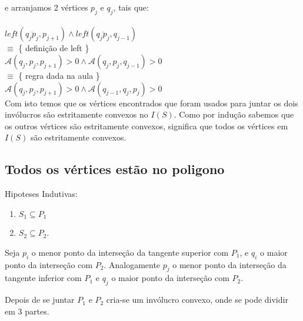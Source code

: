 \documentclass[11pt]{article}
\begin{document}
e arranjamos 2 vértices $p_j$ e $q_j$, tais que:\\
\\
$left(\overline{q_j p_j}, p_{j+1}) \wedge left(\overline{q_j p_j}, q_{j-1})$\\
$\equiv$ \{ definição de left \}\\
$\mathcal{A}(q_j, p_j, p_{j+1}) > 0 \wedge \mathcal{A}(q_j, p_j, q_{j-1}) > 0$\\
$\equiv$ \{ regra dada na aula \}\\
$\mathcal{A}(q_j, p_j, p_{j+1}) > 0 \wedge \mathcal{A}(q_{j-1}, q_j, p_j) > 0$\\

Com isto temos que os vértices encontrados que foram 
usados para juntar os dois invólucros são estritamente
convexos no $I(S)$. Como por indução sabemos que os 
outros vértices são estritamente convexos, significa
que todos os vértices em $I(S)$ são estritamente convexos.


\subsection{Todos os vértices estão no poligono}
Hipoteses Indutivas:
\begin{enumerate}
    \item $S_1 \subseteq P_1$ 
    \item $S_2 \subseteq P_2$.
\end{enumerate}

Seja $p_i$ o menor ponto da interseção da tangente 
superior com $P_1$, e $q_i$ o maior ponto da interseção com $P_2$.
Analogamente $p_j$ o menor ponto da interseção da tangente 
inferior com $P_1$ e $q_j$ o maior ponto da interseção com $P_2$.

Depois de se juntar $P_1$ e $P_2$ cria-se um invólucro convexo,
onde se pode dividir em 3 partes.
\end{document}
